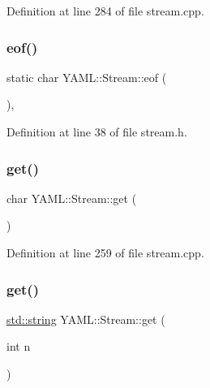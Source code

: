 Definition at line 284 of file stream.\+cpp.

\mbox{\label{class_y_a_m_l_1_1_stream_a250498ea5d09cd3f65da475d46ecd9ae}} 
\subsubsection{\texorpdfstring{eof()}{eof()}}
{\footnotesize\ttfamily static char Y\+A\+M\+L\+::\+Stream\+::eof (\begin{DoxyParamCaption}{ }\end{DoxyParamCaption})\hspace{0.3cm}{\ttfamily [inline]}, {\ttfamily [static]}}



Definition at line 38 of file stream.\+h.

\mbox{\label{class_y_a_m_l_1_1_stream_a98a6753995450fd1af5b9069da66e3a5}} 
\subsubsection{\texorpdfstring{get()}{get()}\hspace{0.1cm}{\footnotesize\ttfamily [1/2]}}
{\footnotesize\ttfamily char Y\+A\+M\+L\+::\+Stream\+::get (\begin{DoxyParamCaption}{ }\end{DoxyParamCaption})}



Definition at line 259 of file stream.\+cpp.

\mbox{\label{class_y_a_m_l_1_1_stream_acaf227379d8db9ee00f646e009d6d2af}} 
\subsubsection{\texorpdfstring{get()}{get()}\hspace{0.1cm}{\footnotesize\ttfamily [2/2]}}
{\footnotesize\ttfamily \mbox{\hyperlink{glad_8h_ac83513893df92266f79a515488701770}{std\+::string}} Y\+A\+M\+L\+::\+Stream\+::get (\begin{DoxyParamCaption}\item[{int}]{n }\end{DoxyParamCaption})}




